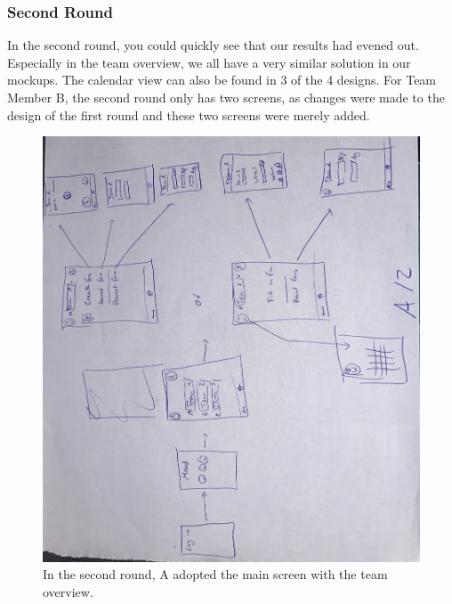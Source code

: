 \documentclass[11pt]{article}
\begin{document}
\clearpage

\subsubsection{Second Round}
In the second round, you could quickly see that our results had evened out. Especially in the team overview, we all have a very similar solution in our mockups. The calendar view can also be found in 3 of the 4 designs. For Team Member B, the second round only has two screens, as changes were made to the design of the first round and these two screens were merely added.

\begin{figure}[!h]
    \centering
    \includegraphics[scale=0.4]{figures/A2.jpg}
    \caption{In the second round, A adopted the main screen with the team overview.}
\end{figure}
\end{document}
